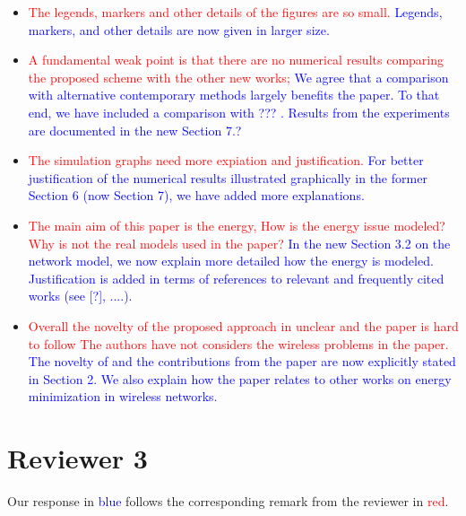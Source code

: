 \documentclass[12pt]{article}
\begin{document}
\begin{itemize}
{Done.
}
\item \textcolor{red}{The legends, markers and other details of the figures are so small.} \textcolor{blue}{
Legends, markers, and other details are now given in larger size.
}
\item \textcolor{red}{A fundamental weak point is that there are no numerical results comparing the proposed scheme with the other new works;} \textcolor{blue}{
We agree that a comparison with alternative contemporary methods largely benefits the paper.
To that end, we have included a comparison with ??? \cite{???}.
Results from the experiments are documented in the new Section 7.?
}
\item \textcolor{red}{The simulation graphs need more expiation and justification.} \textcolor{blue}{
For better justification of the numerical results illustrated graphically in the former Section 6 (now Section 7),
we have added more explanations.
}
\item \textcolor{red}{ The main aim of this paper is the energy, How is the energy issue modeled? Why is not the real models used in the paper?} \textcolor{blue}{
In the new Section 3.2 on the network model, we now explain more detailed how the energy is modeled.
Justification is added in terms of references to relevant and frequently cited works (see [?], ....).
}
\item \textcolor{red}{Overall the novelty of the proposed approach in unclear and the paper is hard to follow
The authors have not considers the wireless problems in the paper.} \textcolor{blue}{
The novelty of and the contributions from the paper are now explicitly stated in Section 2.
We also explain how the paper relates to other works on energy minimization in wireless networks.
}
\end{itemize}

\section*{Reviewer 3}
Our response in \textcolor{blue}{blue} follows the corresponding remark from the reviewer in \textcolor{red}{red}.
\end{document}
